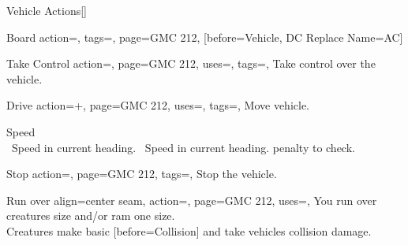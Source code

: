 \begin{PageBack}
\begin{Tables}{\backTableHeight}
\begin{Table}{Vehicle Actions}[]
\begin{entry}{Board}{%
                action=,
                tags=\Move,
                page=GMC 212,
            }
                [before=Vehicle, DC Replace Name=AC]
            \end{entry}
            \begin{entry}{Take Control}{%
                action=,
                page=GMC 212,
                uses=\Piloting,
                tags=\Manipulate,
            }
                Take control over the vehicle. \hfill{} \hfill
            \end{entry}
            \begin{entry}{Drive}{%
                action=+,
                page=GMC 212,
                uses=\Piloting,
                tags=\Move,
            }
                Move vehicle.\hfill
                \begin{minipage}[c]{0.78\linewidth}
                     Speed \quad{} \quad {}\quad {} \\
                    \Reck\, Speed in current heading.\hfill
                    \Reck\, Speed in current heading.  penalty to check.
                \end{minipage}
            \end{entry}
            \begin{entry}{Stop}{%
                action=,
                page=GMC 212,
                tags=\Manipulate,
            }
                Stop the vehicle.
            \end{entry}
            \begin{entry}{Run over}{%
                align=center seam,
                action=,
                page=GMC 212,
                uses={\Piloting[tags=R]},
            }
                You run over creatures  size and/or ram one  size. \hfill
                \\
                Creatures make basic [before=Collision] and take vehicles collision damage. \hfill
            \end{entry}
        \end{Table}
    \end{Tables}%
    \begin{Tables}{\backTableHeight}%

\end{Tables}
\end{PageBack}
